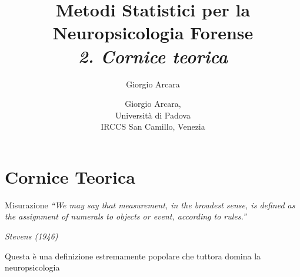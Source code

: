 \documentclass[
  ignorenonframetext,
]{beamer}
\author{Giorgio Arcara}
\date{}
\begin{document}
\begin{frame}
\title{Metodi Statistici per la Neuropsicologia Forense\\ \vspace{1em} \emph{2. Cornice teorica}}
\author{Giorgio Arcara,\\ Università di Padova \\ IRCCS San Camillo, Venezia}

\maketitle
\end{frame}

\section{Cornice Teorica}\label{cornice-teorica}

\begin{frame}{Misurazione}
\label{misurazione}
\emph{``We may say that measurement, in the broadest sense, is defined
as the assignment of numerals to objects or event, according to
rules.''}

\emph{Stevens (1946)} \pause \vspace{2em}

Questa è una definizione estremamente popolare che tuttora domina la
neuropsicologia
\end{frame}
\end{document}
